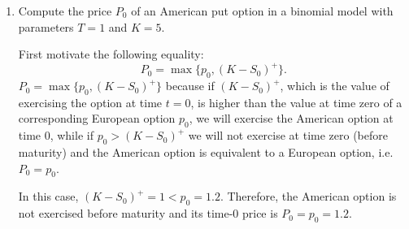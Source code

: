 \documentclass[handout,8pt]{beamer}
\begin{document}
\begin{frame}[allowframebreaks]{ }
\begin{enumerate}
\begin{enumerate}
        \item Compute the price $P_0$ of an American put option in a binomial model with parameters $T=1$ and $K=5$. \newline
        
        First motivate the following equality:
        \begin{equation*}
            P_0=\max\{p_0,(K-S_0)^+\}.
        \end{equation*}
        $P_0 = \max\{p_0,(K-S_0)^+\}$ because if $(K-S_0)^+$, which is the value of exercising the option at time $t=0$, is higher than the value at time zero of a corresponding European option $p_0$, we will exercise the American option at time 0, while if $p_0>(K-S_0)^+$ we will not exercise at time zero (before maturity) and the American option is equivalent to a European option, i.e. $P_0 = p_0$.\newline
        
        In this case, $(K-S_0)^+=1<p_0 = 1.2$. Therefore, the American option is not exercised before maturity and its time-0 price is $P_0=p_0=1.2$. \newline
        

\end{enumerate}
\end{enumerate}
\end{frame}
\end{document}
